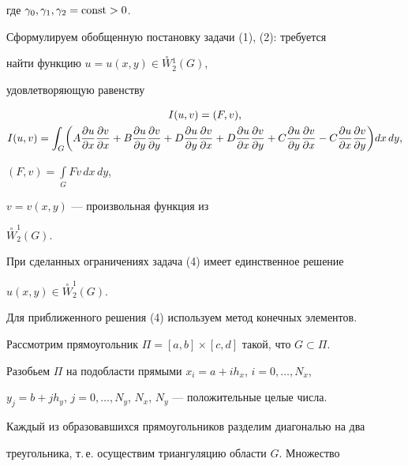 где $\gamma_0,\gamma_1,\gamma_2=\operatorname{const}>0$.





Сформулируем обобщенную постановку задачи (1), (2): требуется


найти функцию $u=u(x,y)\in\overset{\circ}{W}{}_2^1(G)$,


удовлетворяющую равенству


\begin{gather}


I(u,v)=(F,v),\\


%


I(u,v)=\int_G\biggl(A\frac{\partial u}{\partial x}


\frac{\partial v}{\partial x}+B\frac{\partial u}{\partial y}


\frac{\partial v}{\partial y}+D\frac{\partial u}{\partial y}


\frac{\partial v}{\partial x}+D\frac{\partial u}{\partial x}


\frac{\partial v}{\partial y}+C\frac{\partial u}{\partial y}


\frac{\partial v}{\partial x}-C\frac{\partial u}{\partial x}


\frac{\partial v}{\partial y}\biggr)dx\,dy, \notag


\end{gather}


$(F,v)=\int\limits_GFv\,dx\,dy$,


$v=v(x,y)$ --- произвольная функция из 


$\overset{\circ}{W}^1_2(G)$.


При сделанных ограничениях задача (4) имеет единственное решение


$u(x,y)\in\overset{\circ}{W}^1_2(G)$.





Для приближенного решения (4) используем метод конечных элементов.


Рассмотрим прямоугольник $\Pi=[a,b]\times [c,d]$ такой, что $G\subset\Pi$.


Разобьем $\Pi$ на подобласти прямыми $x_i=a+ih_x$, $i=0,\ldots,N_x$,


$y_j=b+jh_y$, $j=0,\dotsc,N_y$, $N_x$, $N_y$ --- положительные целые числа.


Каждый из образовавшихся прямоугольников разделим диагональю на два


треугольника, т.\,е. осуществим триангуляцию области $G$. Множество


